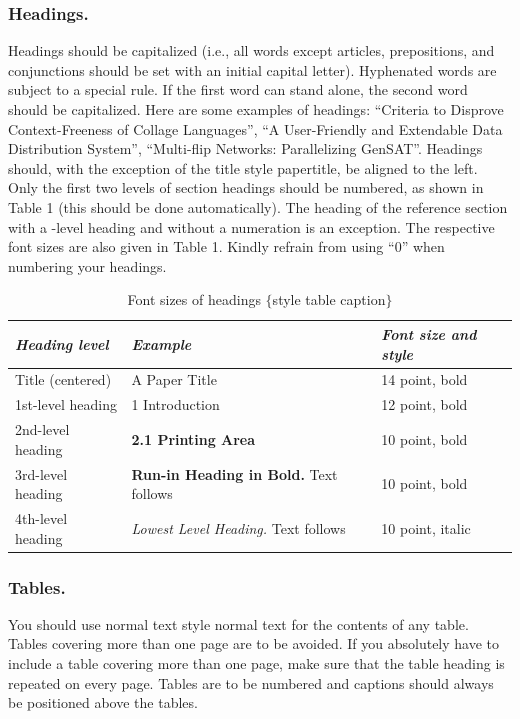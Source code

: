 \documentclass{llncs}
\begin{document}
\subsubsection{Headings.} 
Headings should be capitalized (i.e., all words except articles, prepositions, and conjunctions should be set with an initial capital letter). 
Hyphenated words are subject to a special rule. 
If the first word can stand alone, the second word should be capitalized. 
Here are some examples of headings: “Criteria to Disprove Context-Freeness of Collage Languages”, “A User-Friendly and Extendable Data Distribution System”, “Multi-flip Networks: Parallelizing GenSAT”. 
Headings should, with the exception of the title {style papertitle}, be aligned to the left. 
Only the first two levels of section headings should be numbered, as shown in Table 1 (this should be done automatically). 
The heading of the reference section with a -level heading and without a numeration is an exception. 
The respective font sizes are also given in Table 1. Kindly refrain from using “0” when numbering your headings.

\begin{table}[htb]
\centering
\caption{Font sizes of headings $\{$style table caption$\}$}
\label{tab:my-table}
\begin{tabular}{@{}lll@{}}
\toprule
\textit{Heading level} & \textit{Example} & \textit{Font size and style} \\ \midrule
Title (centered) & \Large{A Paper Title} & 14 point, bold \\
1st-level heading & \large{1 Introduction} & 12 point, bold \\
2nd-level heading & \textbf{2.1 Printing Area} & 10 point, bold \\
3rd-level heading & \textbf{Run-in Heading in Bold.} Text follows & 10 point, bold\\
4th-level heading & \textit{Lowest Level Heading.} Text follows & 10 point, italic \\ \bottomrule
\end{tabular}
\end{table}

\subsubsection{Tables.} 
You should use normal text {style normal text} for the contents of any table. 
Tables covering more than one page are to be avoided. 
If you absolutely have to include a table covering more than one page, make sure that the table heading is repeated on every page. 
Tables are to be numbered and captions should always be positioned above the tables.
\end{document}
